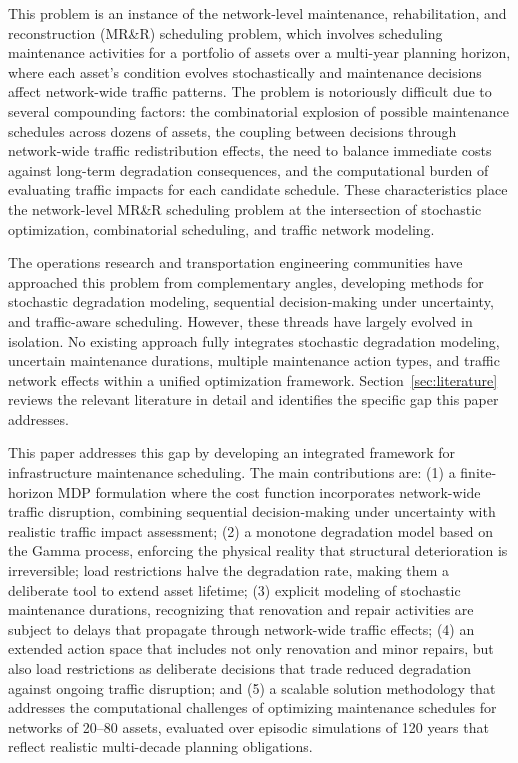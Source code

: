 \documentclass[3p, twocolumn]{elsarticle}
\begin{document}
This problem is an instance of the network-level maintenance, rehabilitation, and reconstruction (MR\&R) scheduling problem, which involves scheduling maintenance activities for a portfolio of assets over a multi-year planning horizon, where each asset's condition evolves stochastically and maintenance decisions affect network-wide traffic patterns. The problem is notoriously difficult due to several compounding factors: the combinatorial explosion of possible maintenance schedules across dozens of assets, the coupling between decisions through network-wide traffic redistribution effects, the need to balance immediate costs against long-term degradation consequences, and the computational burden of evaluating traffic impacts for each candidate schedule. These characteristics place the network-level MR\&R scheduling problem at the intersection of stochastic optimization, combinatorial scheduling, and traffic network modeling.

The operations research and transportation engineering communities have approached this problem from complementary angles, developing methods for stochastic degradation modeling, sequential decision-making under uncertainty, and traffic-aware scheduling. However, these threads have largely evolved in isolation. No existing approach fully integrates stochastic degradation modeling, uncertain maintenance durations, multiple maintenance action types, and traffic network effects within a unified optimization framework. Section~\ref{sec:literature} reviews the relevant literature in detail and identifies the specific gap this paper addresses.

This paper addresses this gap by developing an integrated framework for infrastructure maintenance scheduling. The main contributions are: (1) a finite-horizon MDP formulation where the cost function incorporates network-wide traffic disruption, combining sequential decision-making under uncertainty with realistic traffic impact assessment; (2) a monotone degradation model based on the Gamma process, enforcing the physical reality that structural deterioration is irreversible; load restrictions halve the degradation rate, making them a deliberate tool to extend asset lifetime; (3) explicit modeling of stochastic maintenance durations, recognizing that renovation and repair activities are subject to delays that propagate through network-wide traffic effects; (4) an extended action space that includes not only renovation and minor repairs, but also load restrictions as deliberate decisions that trade reduced degradation against ongoing traffic disruption; and (5) a scalable solution methodology that addresses the computational challenges of optimizing maintenance schedules for networks of 20–80 assets, evaluated over episodic simulations of 120 years that reflect realistic multi-decade planning obligations. 
\end{document}
